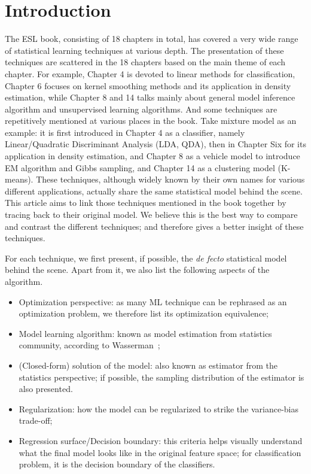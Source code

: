\documentclass[runningheads,a4paper]{llncs}
\begin{document}
\section{Introduction} %
\label{sec:introduction}
The ESL book, consisting of 18 chapters in total, has covered a very wide range of statistical learning techniques at various depth. The presentation of these techniques are scattered in the 18 chapters based on the main theme of each chapter. For example, Chapter 4 is devoted to linear methods for classification, Chapter 6 focuses on kernel smoothing methods and its application in density estimation, while Chapter 8 and 14 talks mainly about general model inference algorithm and unsupervised learning algorithms. And some techniques are repetitively mentioned at various places in the book. Take mixture model as an example: it is first introduced in Chapter 4 as a classifier, namely Linear/Quadratic Discriminant Analysis (LDA, QDA), then in Chapter Six for its application in density estimation, and Chapter 8 as a vehicle model to introduce EM algorithm and Gibbs sampling, and Chapter 14 as a clustering model (K-means). These techniques, although widely known by their own names for various different applications, actually share the same statistical model behind the scene. This article aims to link those techniques mentioned in the book together by tracing back to their original model. We believe this is the best way to compare and contrast the different techniques; and therefore gives a better insight of these techniques. 


For each technique, we first present, if possible, the \textit{de fecto} statistical model behind the scene. Apart from it, we also list the following aspects of the algorithm.
\begin{itemize}
     \item Optimization perspective: as many ML technique can be rephrased as an optimization problem, we therefore list its optimization equivalence; 
     \item Model learning algorithm: known as model estimation from statistics community, according to Wasserman~\cite{wasserman2013all};
     \item (Closed-form) solution of the model: also known as estimator from the statistics perspective; if possible, the sampling distribution of the estimator is also presented.
     \item Regularization: how the model can be regularized to strike the variance-bias trade-off;
     \item Regression surface/Decision boundary: this criteria helps visually understand what the final model looks like in the original feature space; for classification problem, it is the decision boundary of the classifiers. 
 \end{itemize} 
\end{document}
